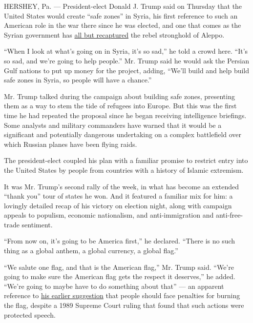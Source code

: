 HERSHEY, Pa. --- President-elect Donald J. Trump said on Thursday that
the United States would create ``safe zones'' in Syria, his first
reference to such an American role in the war there since he was
elected, and one that comes as the Syrian government has
\href{https://www.nytimes3xbfgragh.onion/2016/12/15/world/middleeast/aleppo-syria-evacuation-deal.html}{all
but recaptured} the rebel stronghold of Aleppo.

``When I look at what's going on in Syria, it's so sad,'' he told a
crowd here. ``It's so sad, and we're going to help people.'' Mr. Trump
said he would ask the Persian Gulf nations to put up money for the
project, adding, ``We'll build and help build safe zones in Syria, so
people will have a chance.''

Mr. Trump talked during the campaign about building safe zones,
presenting them as a way to stem the tide of refugees into Europe. But
this was the first time he had repeated the proposal since he began
receiving intelligence briefings. Some analysts and military commanders
have warned that it would be a significant and potentially dangerous
undertaking on a complex battlefield over which Russian planes have been
flying raids.

The president-elect coupled his plan with a familiar promise to restrict
entry into the United States by people from countries with a history of
Islamic extremism.

It was Mr. Trump's second rally of the week, in what has become an
extended ``thank you'' tour of states he won. And it featured a familiar
mix for him: a lovingly detailed recap of his victory on election night,
along with campaign appeals to populism, economic nationalism, and
anti-immigration and anti-free-trade sentiment.

``From now on, it's going to be America first,'' he declared. ``There is
no such thing as a global anthem, a global currency, a global flag.''

``We salute one flag, and that is the American flag,'' Mr. Trump said.
``We're going to make sure the American flag gets the respect it
deserves,'' he added. ``We're going to maybe have to do something about
that'' --- an apparent reference to
\href{https://www.nytimes3xbfgragh.onion/2016/11/29/us/politics/trump-flag-burners-citizenship-first-amendment.html}{his
earlier suggestion} that people should face penalties for burning the
flag, despite a 1989 Supreme Court ruling that found that such actions
were protected speech.

